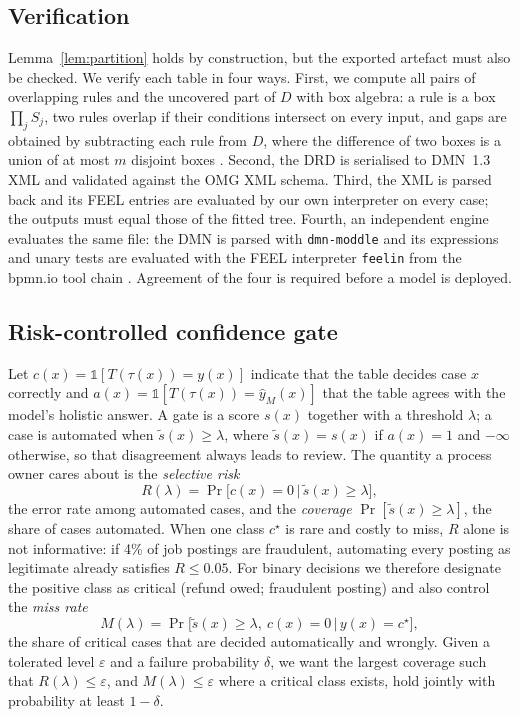 \documentclass[a4paper,fleqn]{cas-sc}
\theoremstyle{definition}
\begin{document}
\subsection{Verification}\label{sec:verify}
Lemma~\ref{lem:partition} holds by construction, but the exported artefact must also be checked. We verify each table in four ways. First, we compute all pairs of overlapping rules and the uncovered part of $D$ with box algebra: a rule is a box $\prod_j S_j$, two rules overlap if their conditions intersect on every input, and gaps are obtained by subtracting each rule from $D$, where the difference of two boxes is a union of at most $m$ disjoint boxes \citep{calvanese2018}. Second, the DRD is serialised to DMN~1.3 XML and validated against the OMG XML schema. Third, the XML is parsed back and its FEEL entries are evaluated by our own interpreter on every case; the outputs must equal those of the fitted tree. Fourth, an independent engine evaluates the same file: the DMN is parsed with \texttt{dmn-moddle} and its expressions and unary tests are evaluated with the FEEL interpreter \texttt{feelin} from the bpmn.io tool chain \citep{feelin}. Agreement of the four is required before a model is deployed.

\subsection{Risk-controlled confidence gate}\label{sec:gate}
Let $c(x)=\mathbb{1}[T(\tau(x))=y(x)]$ indicate that the table decides case $x$ correctly and $a(x)=\mathbb{1}[T(\tau(x))=\hat y_M(x)]$ that the table agrees with the model's holistic answer. A gate is a score $s(x)$ together with a threshold $\lambda$; a case is automated when $\tilde s(x)\ge\lambda$, where $\tilde s(x)=s(x)$ if $a(x)=1$ and $-\infty$ otherwise, so that disagreement always leads to review. The quantity a process owner cares about is the \emph{selective risk}
\begin{equation}
  R(\lambda)=\Pr\big[c(x)=0 \,\big|\, \tilde s(x)\ge\lambda\big],
\end{equation}
the error rate among automated cases, and the \emph{coverage} $\Pr[\tilde s(x)\ge\lambda]$, the share of cases automated. When one class $c^\star$ is rare and costly to miss, $R$ alone is not informative: if 4\% of job postings are fraudulent, automating every posting as legitimate already satisfies $R\le 0.05$. For binary decisions we therefore designate the positive class as critical (refund owed; fraudulent posting) and also control the \emph{miss rate}
\begin{equation}
  M(\lambda)=\Pr\big[\tilde s(x)\ge\lambda,\ c(x)=0 \,\big|\, y(x)=c^\star\big],
\end{equation}
the share of critical cases that are decided automatically and wrongly. Given a tolerated level $\varepsilon$ and a failure probability $\delta$, we want the largest coverage such that $R(\lambda)\le\varepsilon$, and $M(\lambda)\le\varepsilon$ where a critical class exists, hold jointly with probability at least $1-\delta$.
\end{document}
